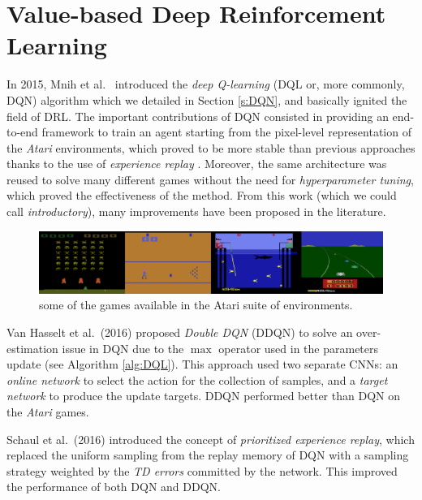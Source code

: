\section{Value-based Deep Reinforcement Learning} \label{SOA:value}
In 2015, Mnih et al.\ \cite{mnih2015human} introduced the \textit{deep 
Q-learning} (DQL or, more commonly, DQN) algorithm which we detailed in Section
\ref{s:DQN}, and basically ignited the field of DRL.
The important contributions of DQN consisted in providing an end-to-end 
framework to train an agent starting from the pixel-level representation of the 
\textit{Atari} environments, which proved to be more stable than previous 
approaches thanks to the use of \textit{experience replay} \cite{lin1992self}. 
Moreover, the same architecture was reused to solve many different games without
the need for \textit{hyperparameter tuning}, which proved the effectiveness of 
the method. 
From this work (which we could call \textit{introductory}), many improvements
have been proposed in the literature.
%
\begin{figure}[h]
\includegraphics[width=\textwidth]{pictures/atari}
\centering
\caption{some of the games available in the Atari suite of environments.}
\end{figure}
%
Van Hasselt et al.\ (2016) proposed \textit{Double DQN} (DDQN) \cite{van2016deep} 
to solve an over-estimation issue in DQN due to the $\max$ operator used in the 
parameters update (see Algorithm \ref{alg:DQL}). This approach used two separate
CNNs: an \textit{online network} to select the action for the collection of 
samples, and a \textit{target network} to produce the update targets. DDQN 
performed better than DQN on the \textit{Atari} games. 

Schaul et al.\ (2016) \cite{schaul2016prioritized} introduced the concept
of \textit{prioritized experience replay}, which replaced the uniform sampling 
from the replay memory of DQN with a sampling strategy weighted by the 
\textit{TD errors} committed by the network. This improved the performance of 
both DQN and DDQN.

